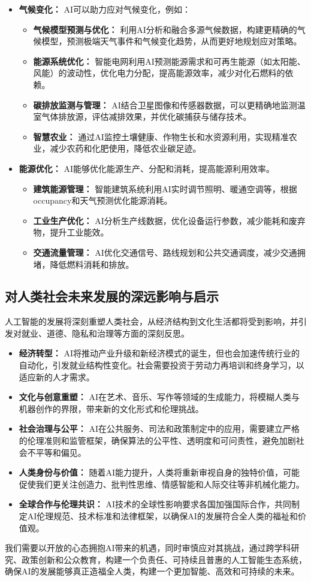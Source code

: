 \begin{itemize}
    \item \textbf{气候变化：} AI可以助力应对气候变化，例如：
    \begin{itemize}
        \item \textbf{气候模型预测与优化：} 利用AI分析和融合多源气候数据，构建更精确的气候模型，预测极端天气事件和气候变化趋势，从而更好地规划应对策略。
        \item \textbf{能源系统优化：} 智能电网利用AI预测能源需求和可再生能源（如太阳能、风能）的波动性，优化电力分配，提高能源效率，减少对化石燃料的依赖。
        \item \textbf{碳排放监测与管理：} AI结合卫星图像和传感器数据，可以更精确地监测温室气体排放源，评估减排效果，并优化碳捕获与储存技术。
        \item \textbf{智慧农业：} 通过AI监控土壤健康、作物生长和水资源利用，实现精准农业，减少农药和化肥使用，降低农业碳足迹。
    \end{itemize}
    \item \textbf{能源优化：} AI能够优化能源生产、分配和消耗，提高能源利用效率。
    \begin{itemize}
        \item \textbf{建筑能源管理：} 智能建筑系统利用AI实时调节照明、暖通空调等，根据occupancy和天气预测优化能源消耗。
        \item \textbf{工业生产优化：} AI分析生产线数据，优化设备运行参数，减少能耗和废弃物，提升工业能效。
        \item \textbf{交通流量管理：} AI优化交通信号、路线规划和公共交通调度，减少交通拥堵，降低燃料消耗和排放。
    \end{itemize}
\end{itemize}

\subsection{对人类社会未来发展的深远影响与启示}
人工智能的发展将深刻重塑人类社会，从经济结构到文化生活都将受到影响，并引发对就业、道德、隐私和治理等方面的深刻反思。

\begin{itemize}
    \item \textbf{经济转型：} AI将推动产业升级和新经济模式的诞生，但也会加速传统行业的自动化，引发就业结构性变化。社会需要投资于劳动力再培训和终身学习，以适应新的人才需求。
    \item \textbf{文化与创意重塑：} AI在艺术、音乐、写作等领域的生成能力，将模糊人类与机器创作的界限，带来新的文化形式和伦理挑战。
    \item \textbf{社会治理与公平：} AI在公共服务、司法和政策制定中的应用，需要建立严格的伦理准则和监管框架，确保算法的公平性、透明度和可问责性，避免加剧社会不平等和偏见。
    \item \textbf{人类身份与价值：} 随着AI能力提升，人类将重新审视自身的独特价值，可能促使我们更关注创造力、批判性思维、情感智能和人际交往等非机械化能力。
    \item \textbf{全球合作与伦理共识：} AI技术的全球性影响要求各国加强国际合作，共同制定AI伦理规范、技术标准和法律框架，以确保AI的发展符合全人类的福祉和价值观。
\end{itemize}

我们需要以开放的心态拥抱AI带来的机遇，同时审慎应对其挑战，通过跨学科研究、政策创新和公众教育，构建一个负责任、可持续且普惠的人工智能生态系统，确保AI的发展能够真正造福全人类，构建一个更加智能、高效和可持续的未来。